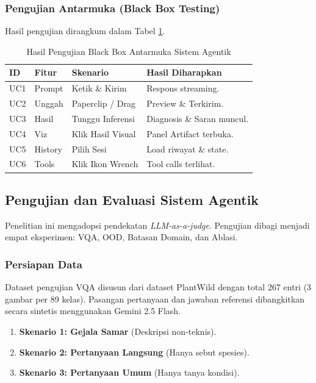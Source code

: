 

\subsubsection{Pengujian Antarmuka (Black Box Testing)}
Hasil pengujian dirangkum dalam Tabel \ref{tab:black_box_testing}.

\begin{table}[H]
    \centering
    \caption{Hasil Pengujian Black Box Antarmuka Sistem Agentik}
    \label{tab:black_box_testing}
    \small
    \begin{tabular}{|l|l|p{4cm}|p{5cm}|}
    \hline
    ID & Fitur & Skenario & Hasil Diharapkan \\ \hline
    UC1 & Prompt & Ketik \& Kirim & Respons streaming. \\ \hline
    UC2 & Unggah & Paperclip / Drag & Preview \& Terkirim. \\ \hline
    UC3 & Hasil & Tunggu Inferensi & Diagnosis \& Saran muncul. \\ \hline
    UC4 & Viz & Klik Hasil Visual & Panel Artifact terbuka. \\ \hline
    UC5 & History & Pilih Sesi & Load riwayat \& state. \\ \hline
    UC6 & Tools & Klik Ikon Wrench & Tool calls terlihat. \\ \hline
    \end{tabular}
\end{table}

\subsection{Pengujian dan Evaluasi Sistem Agentik}
Penelitian ini mengadopsi pendekatan \textit{LLM-as-a-judge}. Pengujian dibagi menjadi empat eksperimen: VQA, OOD, Batasan Domain, dan Ablasi.

\subsubsection{Persiapan Data}
Dataset pengujian VQA disusun dari dataset PlantWild dengan total 267 entri (3 gambar per 89 kelas). Pasangan pertanyaan dan jawaban referensi dibangkitkan secara sintetis menggunakan Gemini 2.5 Flash.

\begin{enumerate}
    \item \textbf{Skenario 1: Gejala Samar} (Deskripsi non-teknis).
    \item \textbf{Skenario 2: Pertanyaan Langsung} (Hanya sebut spesies).
    \item \textbf{Skenario 3: Pertanyaan Umum} (Hanya tanya kondisi).
\end{enumerate}
